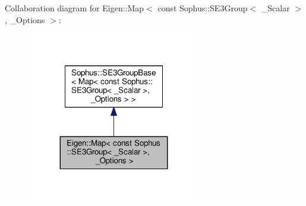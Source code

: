 Collaboration diagram for Eigen\+:\+:Map$<$ const Sophus\+:\+:S\+E3\+Group$<$ \+\_\+\+Scalar $>$, \+\_\+\+Options $>$\+:
\nopagebreak
\begin{figure}[H]
\begin{center}
\leavevmode
\includegraphics[width=215pt]{class_eigen_1_1_map_3_01const_01_sophus_1_1_s_e3_group_3_01___scalar_01_4_00_01___options_01_4__coll__graph}
\end{center}
\end{figure}
